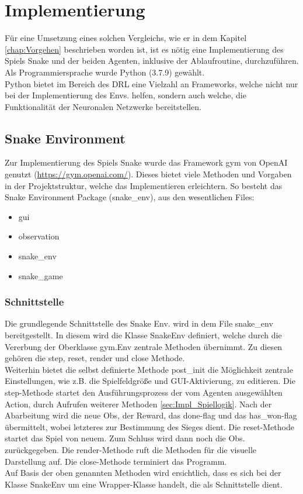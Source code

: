 \chapter{Implementierung}
Für eine Umsetzung eines solchen Vergleichs, wie er in dem Kapitel \ref{chap:Vorgehen} beschrieben worden ist, ist es nötig eine Implementierung des Spiels Snake und der beiden Agenten, inklusive der Ablaufroutine, durchzuführen. Als Programmiersprache wurde Python (3.7.9) gewählt.\\
Python bietet im Bereich des DRL eine Vielzahl an Frameworks, welche nicht nur bei der Implementierung des Envs. helfen, sondern auch welche, die Funktionalität der Neuronalen Netzwerke bereitstellen.

\section{Snake Environment}
Zur Implementierung des Spiels Snake wurde das Framework gym von OpenAI genutzt (\url{https://gym.openai.com/}). Dieses bietet viele Methoden und Vorgaben in der Projektstruktur, welche das Implementieren erleichtern. So besteht das Snake Environment Package (snake\_env), aus den wesentlichen Files:

\begin{itemize}
	\item gui
	\item observation
	\item snake\_env
	\item snake\_game
\end{itemize}

\subsection{Schnittstelle} \label{sec:Impl_Schnittstelle}
Die grundlegende Schnittstelle des Snake Env. wird in dem File snake\_env bereitgestellt. In diesem wird die Klasse SnakeEnv definiert, welche durch die Vererbung der Oberklasse gym.Env zentrale Methoden übernimmt. Zu diesen gehören die step, reset, render und close Methode.\\
Weiterhin bietet die selbst definierte Methode post\_init die Möglichkeit zentrale Einstellungen, wie z.B. die Spielfeldgröße und GUI-Aktivierung, zu editieren. 
Die step-Methode startet den Ausführungsprozess der vom Agenten ausgewählten Action, durch Aufrufen weiterer Methoden \ref{sec:Impl_Spiellogik}. Nach der Abarbeitung wird die neue Obs, der Reward, das done-flag und das has\_won-flag übermittelt, wobei letzteres zur Bestimmung des Sieges dient.
Die reset-Methode startet das Spiel von neuem. Zum Schluss wird dann noch die Obs. zurückgegeben.
Die render-Methode ruft die Methoden für die visuelle Darstellung auf.
Die close-Methode terminiert das Programm.\\
Auf Basis der oben genannten Methoden wird ersichtlich, dass es sich bei der Klasse SnakeEnv um eine Wrapper-Klasse handelt, die als Schnittstelle dient.


